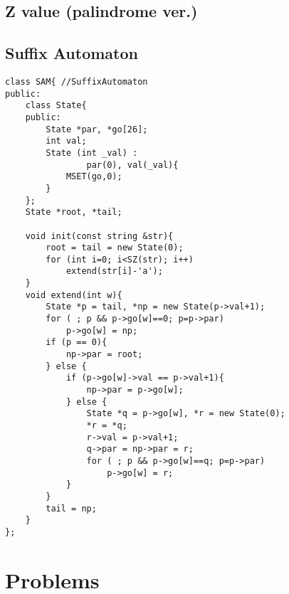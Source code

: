 \documentclass[10pt,twocolumn,oneside]{article}
\begin{document}
\subsection{Z value (palindrome ver.)}


\subsection{Suffix Automaton}
\begin{lstlisting}
class SAM{ //SuffixAutomaton
public:
	class State{
	public:
		State *par, *go[26];
		int val;
		State (int _val) : 
				par(0), val(_val){
			MSET(go,0);
		}
	};
	State *root, *tail;
	
	void init(const string &str){
		root = tail = new State(0);
		for (int i=0; i<SZ(str); i++)
			extend(str[i]-'a');
	}
	void extend(int w){
		State *p = tail, *np = new State(p->val+1);
		for ( ; p && p->go[w]==0; p=p->par)
			p->go[w] = np;
		if (p == 0){
			np->par = root;
		} else {
			if (p->go[w]->val == p->val+1){
				np->par = p->go[w];
			} else {
				State *q = p->go[w], *r = new State(0);
				*r = *q;
				r->val = p->val+1;
				q->par = np->par = r;
				for ( ; p && p->go[w]==q; p=p->par)
					p->go[w] = r;
			}
		}
		tail = np;
	}
};
\end{lstlisting}

\section{Problems}
\end{document}
